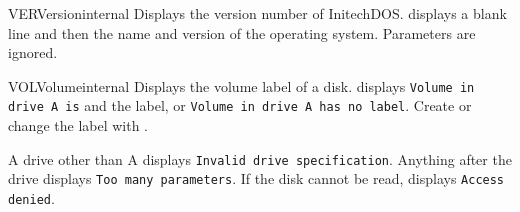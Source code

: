 \begin{DosEntry}{VER}{Version}{internal}
\Purpose Displays the version number of InitechDOS.
\Format {}
\Remarks
{} displays a blank line and then the name and version of the
operating system.  Parameters are ignored.
\Example
{}
\end{DosEntry}

\begin{DosEntry}{VOL}{Volume}{internal}
\Purpose Displays the volume label of a disk.
\Format {}
\Remarks
{} displays \texttt{Volume in drive A is} and the label, or
\texttt{Volume in drive A has no label}.  Create or change the label with
.

A drive other than A displays \texttt{Invalid drive specification}.
Anything after the drive displays \texttt{Too many parameters}.  If the disk
cannot be read,  displays \texttt{Access denied}.
\Example
{}
\end{DosEntry}

